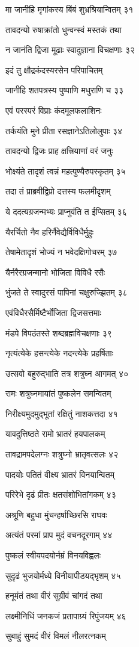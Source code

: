 मा जानीहि मृगांकस्य बिंबं शुभ्रश्रियान्वितम् ३१

तावदन्यो रुषाक्रांतो धुन्वन्स्वं मस्तकं तथा

न जानंति द्विजा मूढाः स्वादुज्ञाना विचक्षणाः ३२

इदं तु क्षौद्रकंदस्यरसेन परिपाचितम्

जानीहि शतपत्रस्य पुष्पाणि मधुराणि च ३३

एवं परस्परं विप्राः कंदमूलफलाशिनः

तर्कयंति मुने प्रीता रसज्ञानेऽतिलोलुपाः ३४

तावदन्यो द्विजः प्राह क्षत्त्रियाणां वरं जनुः

भोक्ष्यंते तादृशं त्वन्नं महत्पुण्यैरुपस्कृतम् ३५

तदा तं प्राब्रवीद्विप्रो दत्तस्य फलमीदृशम्

ये ददत्यग्रजन्मभ्यः प्राप्नुवंति त ईप्सितम् ३६

यैरर्चितो नैव हरिर्नैवेद्यैर्विविधैर्मुहुः

तेषामेतादृशं भोज्यं न भवेदक्षिगोचरम् ३७

यैर्नरैरग्रजन्मानो भोजिता विविधै रसैः

भुंजते ते स्वादुरसं पापिनां चक्षुरुज्झितम् ३८

एवंविधैरसैर्मिष्टैर्भोजिता द्विजसत्तमाः

मंडपे विपठंतस्ते शब्दब्रह्मविचक्षणाः ३९

नृत्यंत्येके हसन्त्येके नदन्त्येके प्रहर्षिताः

उत्सवो बहुरुद्भाति तत्र शत्रुघ्न आगमत् ४०

रामः शत्रुघ्नमायांतं पुष्कलेन समन्वितम्

निरीक्ष्यमुदमुद्भूतां रक्षितुं नाशकत्तदा ४१

यावदुत्तिष्ठते रामो भ्रातरं हयपालकम्

तावद्रामपदेलग्नः शत्रुघ्नो भ्रातृवत्सलः ४२

पादयोः पतितं वीक्ष्य भ्रातरं विनयान्वितम्

परिरेभे दृढं प्रीतः क्षतसंशोभितांगकम् ४३

अश्रूणि बहुधा मुंचन्हर्षाच्छिरसि राघवः

अत्यंतं परमां प्राप मुदं वचनदूरगाम् ४४

पुष्कलं स्वीयपदयोर्नम्रं विनयविह्वलः

सुदृढं भुजयोर्मध्ये विनीयापीडयद्भृशम् ४५

हनूमंतं तथा वीरं सुग्रीवं चांगदं तथा

लक्ष्मीनिधिं जनकजं प्रतापाग्र्यं रिपुंजयम् ४६

सुबाहुं सुमदं वीरं विमलं नीलरत्नकम्

